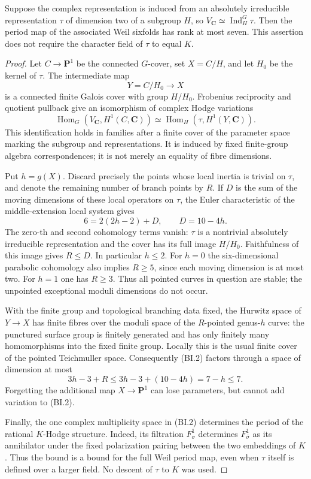 \begin{theorem}
\label{D-BI-01}
Suppose the complex representation is induced from an absolutely
irreducible representation $\tau$ of dimension two of a subgroup
$H$, so $V_{\mathbf C}\simeq\operatorname{Ind}_H^G\tau$.
Then the period map of the associated Weil sixfolds has rank at most
seven.  This assertion does not require the character field of
$\tau$ to equal $K$.
\end{theorem}
\begin{proof}
Let $C\to\mathbf P^1$ be the connected $G$-cover, set $X=C/H$, and
let $H_0$ be the kernel of $\tau$.  The intermediate map
\[
             Y=C/H_0\longrightarrow X
\]
is a connected finite Galois cover with group $H/H_0$.  Frobenius
reciprocity and quotient pullback give an isomorphism of complex
Hodge variations
\[
 \operatorname{Hom}_G(V_{\mathbf C},H^1(C,\mathbf C))
 \simeq \operatorname{Hom}_H(\tau,H^1(Y,\mathbf C)).
\tag{BI.2}
\]
This identification holds in families after a finite cover of the
parameter space marking the subgroup and representations.  It is
induced by fixed finite-group algebra correspondences; it is not
merely an equality of fibre dimensions.

Put $h=g(X)$.  Discard precisely the points whose local inertia is
trivial on $\tau$, and denote the remaining number of branch points
by $R$.  If $D$ is the sum of the moving dimensions of these local
operators on $\tau$, the Euler characteristic of the middle-extension
local system gives
\[
              6=2(2h-2)+D,\qquad D=10-4h.
\tag{BI.3}
\]
The zero-th and second cohomology terms vanish: $\tau$ is a nontrivial
absolutely irreducible representation and the cover has its full
image $H/H_0$.  Faithfulness of this image gives $R\le D$.
In particular $h\le2$.  For $h=0$ the six-dimensional parabolic
cohomology also implies $R\ge5$, since each moving dimension is
at most two.  For $h=1$ one has $R\ge3$.  Thus all pointed curves
in question are stable; the unpointed exceptional moduli dimensions
do not occur.

With the finite group and topological branching data fixed, the
Hurwitz space of $Y\to X$ has finite fibres over the moduli space of
the $R$-pointed genus-$h$ curve: the punctured surface group is
finitely generated and has only finitely many homomorphisms into
the fixed finite group.  Locally this is the usual finite cover of
the pointed Teichmuller space.  Consequently (BI.2) factors through
a space of dimension at most
\[
       3h-3+R\le3h-3+(10-4h)=7-h\le7.
\tag{BI.4}
\]
Forgetting the additional map $X\to\mathbf P^1$ can lose parameters,
but cannot add variation to (BI.2).

Finally, the one complex multiplicity space in (BI.2) determines the
period of the rational $K$-Hodge structure.  Indeed, its filtration
$F^1_\sigma$ determines $F^1_{\bar\sigma}$ as its annihilator under
the fixed polarization pairing between the two embeddings of $K$.
Thus the bound is a bound for the full Weil period map, even when
$\tau$ itself is defined over a larger field.  No descent of
$\tau$ to $K$ was used.
\end{proof}

